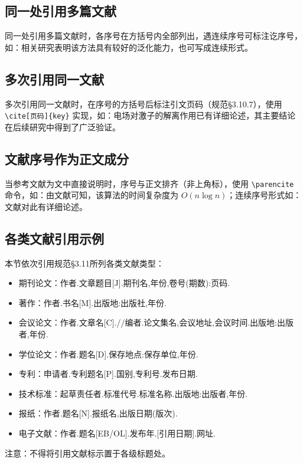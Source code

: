 \subsection{同一处引用多篇文献}

同一处引用多篇文献时，各序号在方括号内全部列出，遇连续序号可标注讫序号，如：相关研究表明该方法具有较好的泛化能力\cite{ref1,ref2,ref3}，也可写成连续形式\cite{ref1,ref4,ref5,ref6}。

\subsection{多次引用同一文献}

多次引用同一文献时，在序号的方括号后标注引文页码（规范§3.10.7），使用 \texttt{\textbackslash cite[页码]\{key\}} 实现，如：电场对激子的解离作用已有详细论述\cite[15-19]{ref1}，其主要结论\cite[25-27]{ref1}在后续研究中得到了广泛验证。

\subsection{文献序号作为正文成分}

当参考文献为文中直接说明时，序号与正文排齐（非上角标），使用 \texttt{\textbackslash parencite} 命令，如：由文献\parencite{ref3}可知，该算法的时间复杂度为 $O(n\log n)$；连续序号形式如：文献\parencite{ref1,ref3,ref4,ref5}对此有详细论述。

\subsection{各类文献引用示例}

本节依次引用规范§3.11所列各类文献类型：

\begin{itemize}
    \item 期刊论文\cite{ref1,ref2,ref3}：作者.文章题目[J].期刊名,年份,卷号(期数):页码.
    \item 著作\cite{ref4,ref5}：作者.书名[M].出版地:出版社,年份.
    \item 会议论文\cite{ref6}：作者.文章名[C].//编者.论文集名,会议地址,会议时间.出版地:出版者,年份.
    \item 学位论文\cite{ref7}：作者.题名[D].保存地点:保存单位,年份.
    \item 专利\cite{ref8}：申请者.专利题名[P].国别,专利号.发布日期.
    \item 技术标准\cite{ref9}：起草责任者.标准代号.标准名称.出版地:出版者,年份.
    \item 报纸\cite{ref10}：作者.题名[N].报纸名,出版日期(版次).
    \item 电子文献\cite{ref11}：作者.题名[EB/OL].发布年.[引用日期].网址.
\end{itemize}

注意：不得将引用文献标示置于各级标题处。


